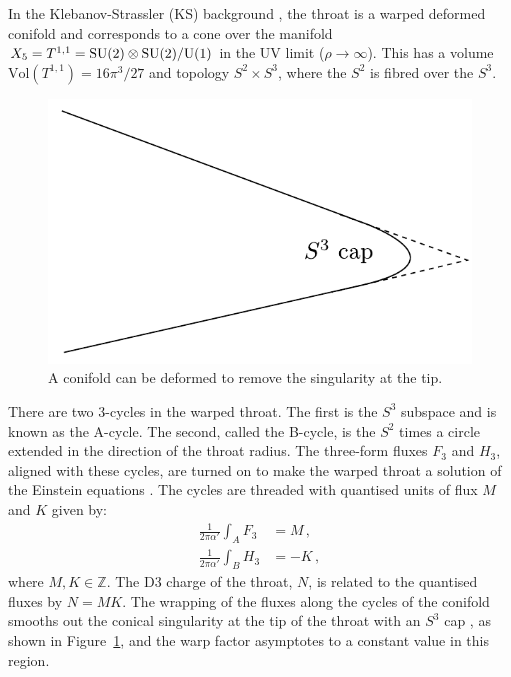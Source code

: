 
In the Klebanov-Strassler (KS) background \cite{ks}, the throat 
is a warped deformed conifold and 
corresponds to a cone over the manifold 
$X_5 = T^{1,1}= {\rm SU(2)} \otimes {\rm SU(2)}/{\rm U(1)}$
in the UV limit ($\rho \rightarrow \infty$). This has   
a volume $\mathrm{Vol} (T^{1,1}) = 16\pi^3/27$ and  topology
$S^2\times S^3$, where the $S^2$ is fibred over the $S^3$.

\begin{figure}[htbp]
\centering
\includegraphics{dbi/graphs/deformed-conifold}   
\caption[Deformed Conifold]{A conifold can be deformed to remove the singularity at
the tip.}
\label{fig:conifold-dbiintro}
\end{figure}

There are two 3-cycles in the warped throat. The first is the $S^3$ subspace and
is known as the A-cycle. The second, called the B-cycle, is the $S^2$ times a
circle extended in the direction of the throat radius. The three-form fluxes
$F_3$ and $H_3$, aligned with these cycles, are turned on to make the warped
throat a solution of the Einstein equations \cite{cline}. The cycles are threaded with
quantised units of flux $M$ and $K$ given by: 
\begin{align}
\label{eq:fluxdefn-dbiintro}
 \frac{1}{2\pi\alpha'}\int_A F_3 &= M \,, \\
 \frac{1}{2\pi\alpha'}\int_B H_3 &= -K\,, 
\end{align}
where $M,K\in \mathbb{Z}$.
The D$3$ charge of the throat, $N$, is related to the quantised fluxes by
$N=MK$.
The wrapping of the fluxes along the cycles of the conifold smooths out the
conical singularity at the tip of the throat with an $S^3$ cap 
\cite{ks,kt}, as shown in Figure~\ref{fig:conifold-dbiintro}, and the warp factor
asymptotes to 
a constant value in this region.


